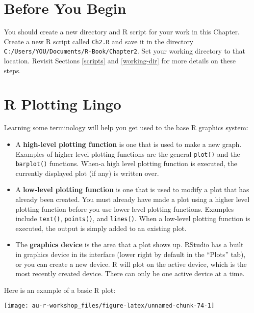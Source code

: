\documentclass[]{book}
\providecommand{\tightlist}{%
  \setlength{\itemsep}{0pt}\setlength{\parskip}{0pt}}
\theoremstyle{definition}
\theoremstyle{definition}
\theoremstyle{definition}
\theoremstyle{remark}
\begin{document}
\section*{Before You Begin}\label{before-you-begin}

You should create a new directory and R script for your work in this
Chapter. Create a new R script called \texttt{Ch2.R} and save it in the
directory \texttt{C:/Users/YOU/Documents/R-Book/Chapter2}. Set your
working directory to that location. Revisit Sections \ref{scripts} and
\ref{working-dir} for more details on these steps.

\section{R Plotting Lingo}\label{r-plotting-lingo}

Learning some terminology will help you get used to the base R graphics
system:

\begin{itemize}
\tightlist
\item
  A \textbf{high-level plotting function} is one that is used to make a
  new graph. Examples of higher level plotting functions are the general
  \texttt{plot()} and the \texttt{barplot()} functions. When-a high
  level plotting function is executed, the currently displayed plot (if
  any) is written over.
\item
  A \textbf{low-level plotting function} is one that is used to modify a
  plot that has already been created. You must already have made a plot
  using a higher level plotting function before you use lower level
  plotting functions. Examples include \texttt{text()},
  \texttt{points()}, and \texttt{lines()}. When a low-level plotting
  function is executed, the output is simply added to an existing plot.
\item
  The \textbf{graphics device} is the area that a plot shows up. RStudio
  has a built in graphics device in its interface (lower right by
  default in the ``Plots'' tab), or you can create a new device. R will
  plot on the active device, which is the most recently created device.
  There can only be one active device at a time.
\end{itemize}

Here is an example of a basic R plot:

\begin{center}\texttt{[image: au-r-workshop\_files/figure-latex/unnamed-chunk-74-1]} \end{center}
\end{document}
